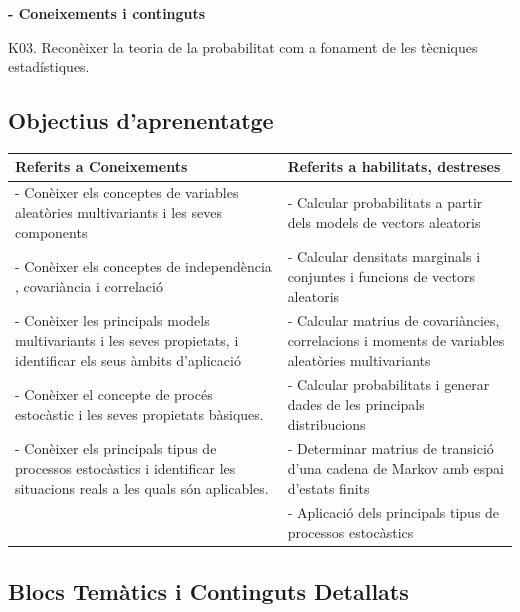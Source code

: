 \documentclass[
  catalan,
]{article}
\newcounter{none} %
\theoremstyle{definition}
\theoremstyle{definition}
\theoremstyle{definition}
\theoremstyle{definition}
\theoremstyle{remark}
\begin{document}
\textbf{- Coneixements i continguts}

K03. Reconèixer la teoria de la probabilitat com a fonament de les tècniques estadístiques.

\subsection*{Objectius d'aprenentatge}\label{objectius-daprenentatge}

{\def\LTcaptype{none} %
\begin{longtable}[]{@{}
  >{\raggedright\arraybackslash}p{}
  >{\raggedright\arraybackslash}p{}@{}}
\toprule\noalign{}
\begin{minipage}[b]{\linewidth}\raggedright
Referits a Coneixements
\end{minipage} & \begin{minipage}[b]{\linewidth}\raggedright
Referits a habilitats, destreses
\end{minipage} \\
\midrule\noalign{}
\endhead
\bottomrule\noalign{}
\endlastfoot
- Conèixer els conceptes de variables aleatòries multivariants i les seves components & - Calcular probabilitats a partir dels models de vectors aleatoris \\
- Conèixer els conceptes de independència , covariància i correlació & - Calcular densitats marginals i conjuntes i funcions de vectors aleatoris \\
- Conèixer les principals models multivariants i les seves propietats, i identificar els seus àmbits d'aplicació & - Calcular matrius de covariàncies, correlacions i moments de variables aleatòries multivariants \\
- Conèixer el concepte de procés estocàstic i les seves propietats bàsiques. & - Calcular probabilitats i generar dades de les principals distribucions \\
- Conèixer els principals tipus de processos estocàstics i identificar les situacions reals a les quals són aplicables. & - Determinar matrius de transició d'una cadena de Markov amb espai d'estats finits \\
& - Aplicació dels principals tipus de processos estocàstics \\
\end{longtable}
}

\subsection*{Blocs Temàtics i Continguts Detallats}\label{blocs-temuxe0tics-i-continguts-detallats}
\end{document}
